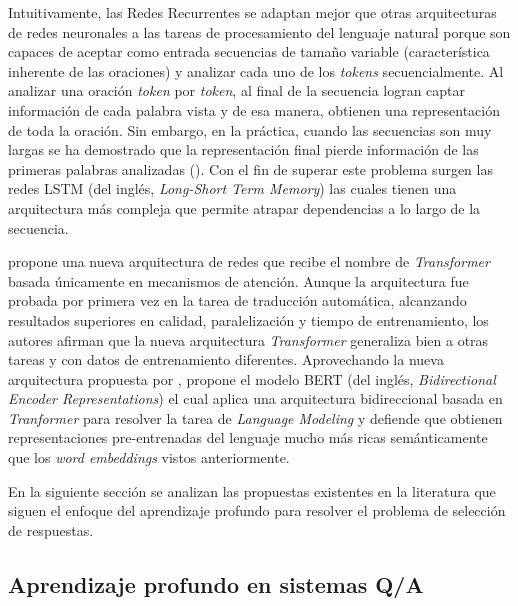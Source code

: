 Intuitivamente, las Redes Recurrentes se adaptan mejor que otras arquitecturas de redes neuronales a las tareas de procesamiento del lenguaje natural porque son capaces de aceptar como entrada secuencias de tamaño variable (característica inherente de las oraciones) y analizar cada uno de los \textit{tokens} secuencialmente. Al analizar una oración \textit{token} por \textit{token}, al final de la secuencia logran captar información de cada palabra vista y de esa manera, obtienen una representación de toda la oración. Sin embargo, en la práctica, cuando las secuencias son muy largas se ha demostrado que la representación final pierde información de las primeras palabras analizadas (\cite{rao-2019-nlpPython}). Con el fin de superar este problema surgen las redes LSTM (del inglés, \textit{Long-Short Term Memory}) las cuales tienen una arquitectura más compleja que permite atrapar dependencias a lo largo de la secuencia.

\cite{vaswani-2017-transformer} propone una nueva arquitectura de redes que recibe el nombre de \textit{Transformer} basada únicamente en mecanismos de atención. Aunque la arquitectura fue probada por primera vez en la tarea de traducción automática, alcanzando resultados superiores en calidad, paralelización y tiempo de entrenamiento, los autores afirman que la nueva arquitectura \textit{Transformer} generaliza bien a otras tareas y con datos de entrenamiento diferentes. Aprovechando la nueva arquitectura propuesta por \cite{vaswani-2017-transformer}, \cite{2018-devlin-bert} propone el modelo BERT (del inglés, \textit{Bidirectional Encoder Representations}) el cual aplica una arquitectura bidireccional basada en \textit{Tranformer} para resolver la tarea de \textit{Language Modeling} y defiende que obtienen representaciones pre-entrenadas del lenguaje mucho más ricas semánticamente que los \textit{word embeddings} vistos anteriormente.

En la siguiente sección se analizan las propuestas existentes en la literatura que siguen el enfoque del aprendizaje profundo para resolver el problema de selección de respuestas.

\subsection{Aprendizaje profundo en sistemas Q/A}

